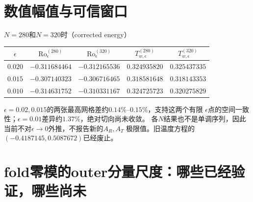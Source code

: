 \documentclass[UTF8,zihao=-4,openany]{ctexbook}
\newcommand{\eps}{\epsilon}
\newcommand{\Ro}{\mathrm{Ro}}
\begin{document}
\section{数值幅值与可信窗口}

$N=280$和$N=320$时（corrected energy）
\begin{center}
\begin{tabular}{ccccc}
\toprule
$\eps$ & $\Ro_\eps^{(280)}$ & $\Ro_\eps^{(320)}$ &
$T_{w,\eps}^{(280)}$ & $T_{w,\eps}^{(320)}$\\
\midrule
$0.020$ & $-0.311684464$ & $-0.312165536$ & $0.324935820$ & $0.325437335$\\
$0.015$ & $-0.307140323$ & $-0.306716465$ & $0.318581648$ & $0.318143353$\\
$0.010$ & $-0.314631752$ & $-0.310331167$ & $0.324725723$ & $0.320275829$\\
\bottomrule
\end{tabular}
\end{center}
$\eps=0.02,0.015$的两张最高网格差约$0.14\%$--$0.15\%$，支持这两个有限
$\eps$点的空间一致性；$\eps=0.01$差异约$1.37\%$，绝对切向尚未收敛。
各$N$结果也不是单调序列，因此当前不对$\eps\to0$外推，不报告新的$A_R,A_T$
极限值。旧温度方程的$(-0.4187145,0.5087672)$已经废止。

\section{fold零模的outer分量尺度：哪些已经验证，哪些尚未}
\end{document}
